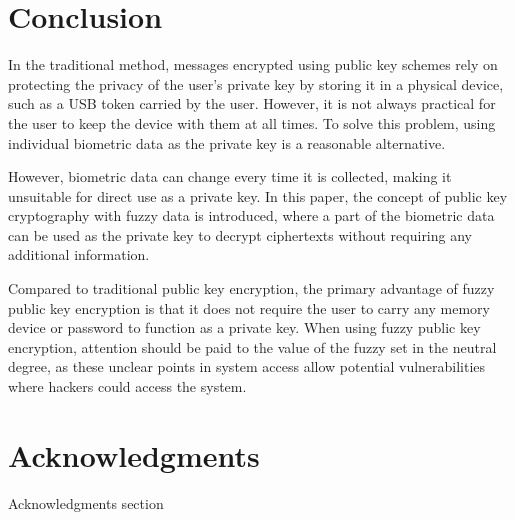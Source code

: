 \documentclass[graybox]{svmult}
\begin{document}
\section{Conclusion}
In the traditional method, messages encrypted using public key schemes rely on protecting the privacy of the user's private key by storing it in a physical device, such as a USB token carried by the user. However, it is not always practical for the user to keep the device with them at all times. To solve this problem, using individual biometric data as the private key is a reasonable alternative.

However, biometric data can change every time it is collected, making it unsuitable for direct use as a private key. In this paper, the concept of public key cryptography with fuzzy data is introduced, where a part of the biometric data can be used as the private key to decrypt ciphertexts without requiring any additional information.

Compared to traditional public key encryption, the primary advantage of fuzzy public key encryption is that it does not require the user to carry any memory device or password to function as a private key. When using fuzzy public key encryption, attention should be paid to the value of the fuzzy set in the neutral degree, as these unclear points in system access allow potential vulnerabilities where hackers could access the system.

\section*{Acknowledgments}
Acknowledgments section




\end{document}
